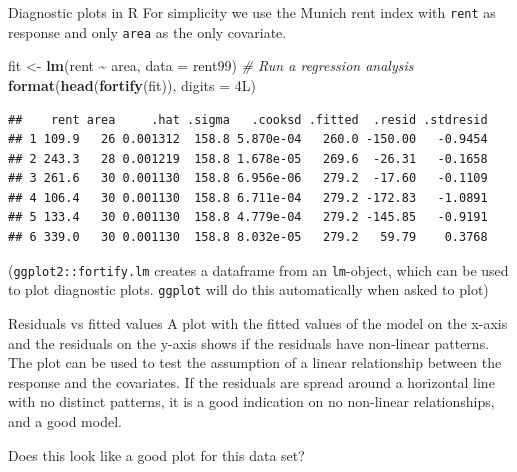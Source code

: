 \documentclass[
  ignorenonframetext,
]{beamer}
\newenvironment{Shaded}{\begin{snugshade}}{\end{snugshade}}
\newcommand{\AttributeTok}[1]{\textcolor[rgb]{0.13,0.29,0.53}{#1}}
\newcommand{\CommentTok}[1]{\textcolor[rgb]{0.56,0.35,0.01}{\textit{#1}}}
\newcommand{\DataTypeTok}[1]{\textcolor[rgb]{0.13,0.29,0.53}{#1}}
\newcommand{\DecValTok}[1]{\textcolor[rgb]{0.00,0.00,0.81}{#1}}
\newcommand{\FunctionTok}[1]{\textcolor[rgb]{0.13,0.29,0.53}{\textbf{#1}}}
\newcommand{\NormalTok}[1]{#1}
\newcommand{\OtherTok}[1]{\textcolor[rgb]{0.56,0.35,0.01}{#1}}
\newcommand{\SpecialCharTok}[1]{\textcolor[rgb]{0.81,0.36,0.00}{\textbf{#1}}}
\begin{document}
\begin{frame}[fragile]
\begin{block}{Diagnostic plots in R}
\label{diagnostic-plots-in-r}
For simplicity we use the Munich rent index with \texttt{rent} as
response and only \texttt{area} as the only covariate.

\footnotesize

\begin{Shaded}
\begin{Highlighting}[]
\NormalTok{fit }\OtherTok{\textless{}{-}} \FunctionTok{lm}\NormalTok{(rent }\SpecialCharTok{\textasciitilde{}}\NormalTok{ area, }\AttributeTok{data =}\NormalTok{ rent99)  }\CommentTok{\# Run a regression analysis}
\FunctionTok{format}\NormalTok{(}\FunctionTok{head}\NormalTok{(}\FunctionTok{fortify}\NormalTok{(fit)), }\AttributeTok{digits =} \DecValTok{4}\DataTypeTok{L}\NormalTok{)}
\end{Highlighting}
\end{Shaded}

\begin{verbatim}
##    rent area     .hat .sigma   .cooksd .fitted  .resid .stdresid
## 1 109.9   26 0.001312  158.8 5.870e-04   260.0 -150.00   -0.9454
## 2 243.3   28 0.001219  158.8 1.678e-05   269.6  -26.31   -0.1658
## 3 261.6   30 0.001130  158.8 6.956e-06   279.2  -17.60   -0.1109
## 4 106.4   30 0.001130  158.8 6.711e-04   279.2 -172.83   -1.0891
## 5 133.4   30 0.001130  158.8 4.779e-04   279.2 -145.85   -0.9191
## 6 339.0   30 0.001130  158.8 8.032e-05   279.2   59.79    0.3768
\end{verbatim}

(\texttt{ggplot2::fortify.lm} creates a dataframe from an
\texttt{lm}-object, which can be used to plot diagnostic plots.
\texttt{ggplot} will do this automatically when asked to plot)
\end{block}
\end{frame}

\begin{frame}
\begin{block}{Residuals vs fitted values}
\label{residuals-vs-fitted-values}
A plot with the fitted values of the model on the x-axis and the
residuals on the y-axis shows if the residuals have non-linear patterns.
The plot can be used to test the assumption of a linear relationship
between the response and the covariates. If the residuals are spread
around a horizontal line with no distinct patterns, it is a good
indication on no non-linear relationships, and a good model.

Does this look like a good plot for this data set?
\end{block}
\end{frame}
\end{document}

